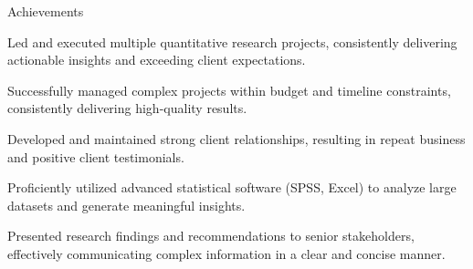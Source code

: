 \documentclass{resume} %
\begin{document}
    \begin{rSection}{Achievements}
        \begin{rSubsection}{}{}{}
                            \item Led and executed multiple quantitative research projects, consistently delivering actionable insights and exceeding client expectations.
                            \item Successfully managed complex projects within budget and timeline constraints, consistently delivering high{-}quality results.
                            \item Developed and maintained strong client relationships, resulting in repeat business and positive client testimonials.
                            \item Proficiently utilized advanced statistical software (SPSS, Excel) to analyze large datasets and generate meaningful insights.
                            \item Presented research findings and recommendations to senior stakeholders, effectively communicating complex information in a clear and concise manner.
                    \end{rSubsection}
    \end{rSection}
\end{document}
